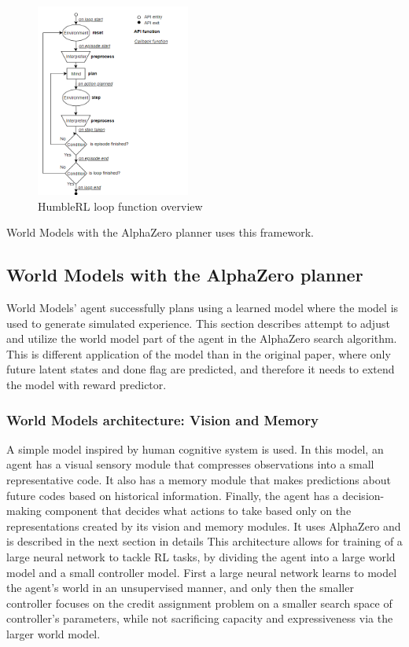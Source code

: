 \begin{figure}[H]
\includegraphics[width=0.45\textwidth,height=0.9\textheight,keepaspectratio]{figures/HumbleRL/loop.png}
\caption{HumbleRL loop function overview}
\label{Fig.HRL_loop}
\end{figure}

World Models with the AlphaZero planner uses this framework.

\subsection{World Models with the AlphaZero planner}

World Models' agent \cite{Algo.WorldModels} successfully plans using a learned model where the model is used to generate simulated experience. This section describes attempt to adjust and utilize the world model part of the agent in the AlphaZero search algorithm. This is different application of the model than in the original paper, where only future latent states and done flag are predicted, and therefore it needs to extend the model with reward predictor.

\subsubsection{World Models architecture: Vision and Memory}

A simple model inspired by human cognitive system is used. In this model, an agent has a visual sensory module that compresses observations into a small representative code. It also has a memory module that makes predictions about future codes based on historical information. Finally, the agent has a decision-making component that decides what actions to take based only on the representations created by its vision and memory modules. It uses AlphaZero and is described in the next section in details
This architecture allows for training of a large neural network to tackle RL tasks, by dividing the agent into a large world model and a small controller model. First a large neural network learns to model the agent’s world in an unsupervised manner, and only then the smaller controller focuses on the credit assignment problem on a smaller search space of controller's parameters, while not sacrificing capacity and expressiveness via the larger world model.

